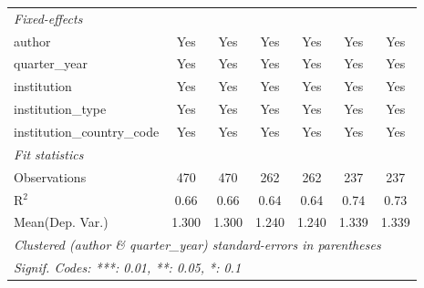 \begin{tabular}{lcccccc}
   \midrule
   \emph{Fixed-effects}\\
   author                                   & Yes     & Yes     & Yes     & Yes     & Yes     & Yes\\  
   quarter\_year                            & Yes     & Yes     & Yes     & Yes     & Yes     & Yes\\  
   institution                              & Yes     & Yes     & Yes     & Yes     & Yes     & Yes\\  
   institution\_type                        & Yes     & Yes     & Yes     & Yes     & Yes     & Yes\\  
   institution\_country\_code               & Yes     & Yes     & Yes     & Yes     & Yes     & Yes\\  
   \midrule
   \emph{Fit statistics}\\
   Observations                             & 470     & 470     & 262     & 262     & 237     & 237\\  
   R$^2$                                    & 0.66    & 0.66    & 0.64    & 0.64    & 0.74    & 0.73\\  
Mean(Dep. Var.) & 1.300 & 1.300 & 1.240 & 1.240 & 1.339 & 1.339 \\
   \midrule \midrule
   \multicolumn{7}{l}{\emph{Clustered (author \& quarter\_year) standard-errors in parentheses}}\\
   \multicolumn{7}{l}{\emph{Signif. Codes: ***: 0.01, **: 0.05, *: 0.1}}\\
\end{tabular}
\par\endgroup
